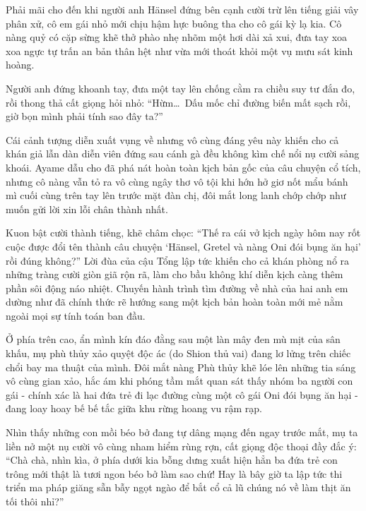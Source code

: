 \documentclass[../main.tex]{subfiles}
\begin{document}
Phải mãi cho đến khi người anh Hänsel đứng bên cạnh cười trừ lên tiếng giải vây phân xử, cô em gái nhỏ mới chịu hậm hực buông tha cho cô gái kỳ lạ kia. Cô nàng quỷ có cặp sừng khẽ thở phào nhẹ nhõm một hơi dài xả xui, đưa tay xoa xoa ngực tự trấn an bản thân hệt như vừa mới thoát khỏi một vụ mưu sát kinh hoàng.

Người anh đứng khoanh tay, đưa một tay lên chống cằm ra chiều suy tư đắn đo, rồi thong thả cất giọng hỏi nhỏ: ``Hừm\dots\ Dấu mốc chỉ đường biến mất sạch rồi, giờ bọn mình phải tính sao đây ta?''

\il

Cái cảnh tượng diễn xuất vụng về nhưng vô cùng đáng yêu này khiến cho cả khán giả lẫn dàn diễn viên đứng sau cánh gà đều không kìm chế nổi nụ cười sảng khoái. Ayame dẫu cho đã phá nát hoàn toàn kịch bản gốc của câu chuyện cổ tích, nhưng cô nàng vẫn tỏ ra vô cùng ngây thơ vô tội khi hớn hở giơ nốt mẩu bánh mì cuối cùng trên tay lên trước mặt đàn chị, đôi mắt long lanh chớp chớp như muốn gửi lời xin lỗi chân thành nhất.

Kuon bật cười thành tiếng, khẽ châm chọc: ``Thế ra cái vở kịch ngày hôm nay rốt cuộc được đổi tên thành câu chuyện `Hänsel, Gretel và nàng Oni đói bụng ăn hại' rồi đúng không?'' Lời đùa của cậu Tổng lập tức khiến cho cả khán phòng nổ ra những tràng cười giòn giã rộn rã, làm cho bầu không khí diễn kịch càng thêm phần sôi động náo nhiệt. Chuyến hành trình tìm đường về nhà của hai anh em dường như đã chính thức rẽ hướng sang một kịch bản hoàn toàn mới mẻ nằm ngoài mọi sự tính toán ban đầu.

\il

Ở phía trên cao, ẩn mình kín đáo đằng sau một làn mây đen mù mịt của sân khấu, mụ phù thủy xảo quyệt độc ác (do Shion thủ vai) đang lơ lửng trên chiếc chổi bay ma thuật của mình. Đôi mắt nàng Phù thủy khẽ lóe lên những tia sáng vô cùng gian xảo, hắc ám khi phóng tầm mắt quan sát thấy nhóm ba người con gái - chính xác là hai đứa trẻ đi lạc đường cùng một cô gái Oni đói bụng ăn hại - đang loay hoay bế bế tắc giữa khu rừng hoang vu rậm rạp.

Nhìn thấy những con mồi béo bở đang tự dâng mạng đến ngay trước mắt, mụ ta liền nở một nụ cười vô cùng nham hiểm rùng rợn, cất giọng độc thoại đầy đắc ý: ``Chà chà, nhìn kìa, ở phía dưới kia bỗng dưng xuất hiện hẳn ba đứa trẻ con trông mới thật là tươi ngon béo bở làm sao chứ! Hay là bây giờ ta lập tức thi triển ma pháp giăng sẵn bẫy ngọt ngào để bắt cổ cả lũ chúng nó về làm thịt ăn tối thôi nhỉ?''
\end{document}
